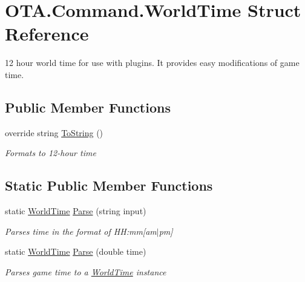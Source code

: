 \hypertarget{struct_o_t_a_1_1_command_1_1_world_time}{}\section{O\+T\+A.\+Command.\+World\+Time Struct Reference}
\label{struct_o_t_a_1_1_command_1_1_world_time}


12 hour world time for use with plugins. It provides easy modifications of game time.  


\subsection*{Public Member Functions}
\begin{DoxyCompactItemize}
\item 
override string \hyperlink{struct_o_t_a_1_1_command_1_1_world_time_a986d040248187f3ed1b225b1b6ba134e}{To\+String} ()
\begin{DoxyCompactList}\small\item\em Formats to 12-\/hour time \end{DoxyCompactList}\end{DoxyCompactItemize}
\subsection*{Static Public Member Functions}
\begin{DoxyCompactItemize}
\item 
static \hyperlink{struct_o_t_a_1_1_command_1_1_world_time}{World\+Time} \hyperlink{struct_o_t_a_1_1_command_1_1_world_time_a498df5c3d6519bc10c7450f81a107539}{Parse} (string input)
\begin{DoxyCompactList}\small\item\em Parses time in the format of H\+H\+:mm\mbox{[}am$\vert$pm\mbox{]} \end{DoxyCompactList}\item 
static \hyperlink{struct_o_t_a_1_1_command_1_1_world_time}{World\+Time} \hyperlink{struct_o_t_a_1_1_command_1_1_world_time_a9f1c8b194eb9c8ae00a52af13d7d69b1}{Parse} (double time)
\begin{DoxyCompactList}\small\item\em Parses game time to a \hyperlink{struct_o_t_a_1_1_command_1_1_world_time}{World\+Time} instance \end{DoxyCompactList}\end{DoxyCompactItemize}
